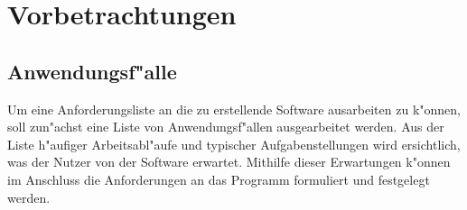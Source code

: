 \chapter{Vorbetrachtungen}

\section{Anwendungsf"alle}

Um eine Anforderungsliste an die zu erstellende Software ausarbeiten zu k"onnen, soll zun"achst eine Liste von Anwendungsf"allen ausgearbeitet werden.
Aus der Liste h"aufiger Arbeitsabl"aufe und typischer Aufgabenstellungen wird ersichtlich, was der Nutzer von der Software erwartet.
Mithilfe dieser Erwartungen k"onnen im Anschluss die Anforderungen an das Programm formuliert und festgelegt werden.

